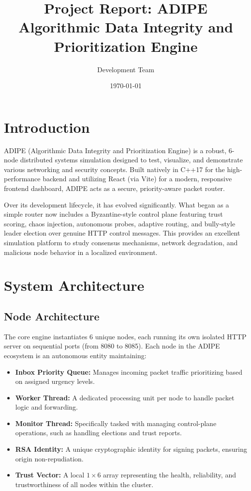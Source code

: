 \documentclass[12pt]{article}
\title{
    \vspace{2cm}
    \textbf{\huge Project Report: ADIPE} \\
    \vspace{0.5cm}
    \Large Algorithmic Data Integrity and Prioritization Engine
    \vspace{2cm}
}
\author{Development Team}
\date{\today}
\begin{document}
\maketitle
\thispagestyle{empty}
\newpage

\tableofcontents
\newpage

\section{Introduction}
ADIPE (Algorithmic Data Integrity and Prioritization Engine) is a robust, 6-node distributed systems simulation designed to test, visualize, and demonstrate various networking and security concepts. Built natively in C++17 for the high-performance backend and utilizing React (via Vite) for a modern, responsive frontend dashboard, ADIPE acts as a secure, priority-aware packet router. 

Over its development lifecycle, it has evolved significantly. What began as a simple router now includes a Byzantine-style control plane featuring trust scoring, chaos injection, autonomous probes, adaptive routing, and bully-style leader election over genuine HTTP control messages. This provides an excellent simulation platform to study consensus mechanisms, network degradation, and malicious node behavior in a localized environment.

\section{System Architecture}

\subsection{Node Architecture}
The core engine instantiates 6 unique nodes, each running its own isolated HTTP server on sequential ports (from 8080 to 8085). Each node in the ADIPE ecosystem is an autonomous entity maintaining:
\begin{itemize}
    \item \textbf{Inbox Priority Queue:} Manages incoming packet traffic prioritizing based on assigned urgency levels.
    \item \textbf{Worker Thread:} A dedicated processing unit per node to handle packet logic and forwarding.
    \item \textbf{Monitor Thread:} Specifically tasked with managing control-plane operations, such as handling elections and trust reports.
    \item \textbf{RSA Identity:} A unique cryptographic identity for signing packets, ensuring origin non-repudiation.
    \item \textbf{Trust Vector:} A local $1 \times 6$ array representing the health, reliability, and trustworthiness of all nodes within the cluster.
\end{itemize}
\end{document}
